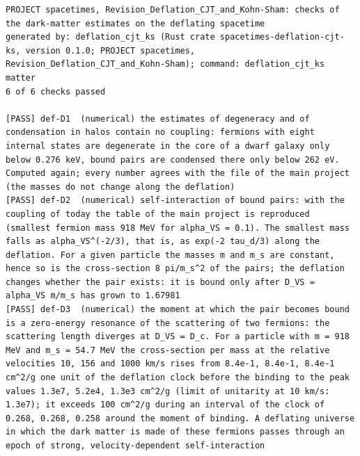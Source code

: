 \documentclass[
  10pt,
]{article}
\begin{document}
\begin{verbatim}
PROJECT spacetimes, Revision_Deflation_CJT_and_Kohn-Sham: checks of the dark-matter estimates on the deflating spacetime
generated by: deflation_cjt_ks (Rust crate spacetimes-deflation-cjt-ks, version 0.1.0; PROJECT spacetimes, Revision_Deflation_CJT_and_Kohn-Sham); command: deflation_cjt_ks matter
6 of 6 checks passed

[PASS] def-D1  (numerical) the estimates of degeneracy and of condensation in halos contain no coupling: fermions with eight internal states are degenerate in the core of a dwarf galaxy only below 0.276 keV, bound pairs are condensed there only below 262 eV. Computed again; every number agrees with the file of the main project (the masses do not change along the deflation)
[PASS] def-D2  (numerical) self-interaction of bound pairs: with the coupling of today the table of the main project is reproduced (smallest fermion mass 918 MeV for alpha_VS = 0.1). The smallest mass falls as alpha_VS^(-2/3), that is, as exp(-2 tau_d/3) along the deflation. For a given particle the masses m and m_s are constant, hence so is the cross-section 8 pi/m_s^2 of the pairs; the deflation changes whether the pair exists: it is bound only after D_VS = alpha_VS m/m_s has grown to 1.67981
[PASS] def-D3  (numerical) the moment at which the pair becomes bound is a zero-energy resonance of the scattering of two fermions: the scattering length diverges at D_VS = D_c. For a particle with m = 918 MeV and m_s = 54.7 MeV the cross-section per mass at the relative velocities 10, 156 and 1000 km/s rises from 8.4e-1, 8.4e-1, 8.4e-1 cm^2/g one unit of the deflation clock before the binding to the peak values 1.3e7, 5.2e4, 1.3e3 cm^2/g (limit of unitarity at 10 km/s: 1.3e7); it exceeds 100 cm^2/g during an interval of the clock of 0.268, 0.268, 0.258 around the moment of binding. A deflating universe in which the dark matter is made of these fermions passes through an epoch of strong, velocity-dependent self-interaction

\end{verbatim}
\end{document}
